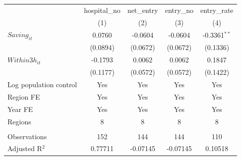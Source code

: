 \begingroup
\centering
\begin{tabular}{lcccc}
   \toprule
                          & hospital\_no  & net\_entry  & entry\_no  & entry\_rate \\    
                          & (1)           & (2)         & (3)        & (4)\\  
   \midrule 
   $Saving_{it}$          & 0.0760        & -0.0604     & -0.0604    & -0.3361$^{**}$\\   
                          & (0.0894)      & (0.0672)    & (0.0672)   & (0.1336)\\   
   $Within3h_{it}$        & -0.1793       & 0.0062      & 0.0062     & 0.1847\\   
                          & (0.1177)      & (0.0572)    & (0.0572)   & (0.1422)\\   
   Log population control & Yes           & Yes         & Yes        & Yes\\  
   Region FE              & Yes           & Yes         & Yes        & Yes\\  
   Year FE                & Yes           & Yes         & Yes        & Yes\\  
   Regions                & 8             & 8           & 8          & 8\\  
    \\
   Observations           & 152           & 144         & 144        & 110\\  
   Adjusted R$^2$         & 0.77711       & -0.07145    & -0.07145   & 0.10518\\  
   \bottomrule
\end{tabular}
\par\endgroup
